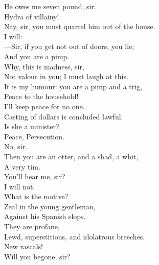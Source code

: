 \documentclass[a4paper,oneside,12pt]{memoir}
\begin{document}
\begin{drama*}
\druggerspeaks He owes me seven pound, sir.\\
\surlyspeaks {} Hydra of villainy!\\
\facespeaks Nay, sir, you must quarrel him out of the house.\\
\kastrilspeaks {} I will:\\
---Sir, if you get not out of doors, you lie;\\
And you are a pimp.\\
\surlyspeaks {} Why, this is madness, sir,\\
Not valour in you; I must laugh at this.\\
\kastrilspeaks It is my humour: you are a pimp and a trig,\\
\persecutionspeaks Peace to the household!\\
\kastrilspeaks {} I'll keep peace for no one.\\
\persecutionspeaks Casting of dollars is concluded lawful.\\
\kastrilspeaks Is she a minister?\\
\subtlespeaks {} Peace, Persecution.\\
\facespeaks No, sir.\\
\kastrilspeaks {} Then you are an otter, and a shad, a whit,\\
A very tim.\\
\surlyspeaks {} You'll hear me, sir?\\
\kastrilspeaks {} I will not.\\
\persecutionspeaks What is the motive?\\
\subtlespeaks {} Zeal in the young gentleman,\\
Against his Spanish slops.\\
\persecutionspeaks {} They are profane,\\
Lewd, superstitious, and idolatrous breeches.\\
\surlyspeaks New rascals!\\
\kastrilspeaks {} Will you begone, sir?\\

\end{drama*}
\end{document}
